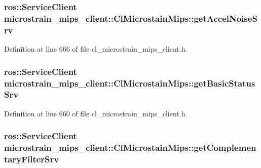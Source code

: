 \subsubsection[{\texorpdfstring{get\+Accel\+Noise\+Srv}{getAccelNoiseSrv}}]{\setlength{\rightskip}{0pt plus 5cm}ros\+::\+Service\+Client microstrain\+\_\+mips\+\_\+client\+::\+Cl\+Microstain\+Mips\+::get\+Accel\+Noise\+Srv\hspace{0.3cm}{\ttfamily [protected]}}\hypertarget{classmicrostrain__mips__client_1_1ClMicrostainMips_a3c8688daacb1472f90d788e186de6643}{}\label{classmicrostrain__mips__client_1_1ClMicrostainMips_a3c8688daacb1472f90d788e186de6643}


Definition at line 666 of file cl\+\_\+microstrain\+\_\+mips\+\_\+client.\+h.

\subsubsection[{\texorpdfstring{get\+Basic\+Status\+Srv}{getBasicStatusSrv}}]{\setlength{\rightskip}{0pt plus 5cm}ros\+::\+Service\+Client microstrain\+\_\+mips\+\_\+client\+::\+Cl\+Microstain\+Mips\+::get\+Basic\+Status\+Srv\hspace{0.3cm}{\ttfamily [protected]}}\hypertarget{classmicrostrain__mips__client_1_1ClMicrostainMips_a9d9417b8082c318709d5644895a4f539}{}\label{classmicrostrain__mips__client_1_1ClMicrostainMips_a9d9417b8082c318709d5644895a4f539}


Definition at line 660 of file cl\+\_\+microstrain\+\_\+mips\+\_\+client.\+h.

\subsubsection[{\texorpdfstring{get\+Complementary\+Filter\+Srv}{getComplementaryFilterSrv}}]{\setlength{\rightskip}{0pt plus 5cm}ros\+::\+Service\+Client microstrain\+\_\+mips\+\_\+client\+::\+Cl\+Microstain\+Mips\+::get\+Complementary\+Filter\+Srv\hspace{0.3cm}{\ttfamily [protected]}}\hypertarget{classmicrostrain__mips__client_1_1ClMicrostainMips_a6011cb4bf116dc0b92eff7b3409c3633}{}\label{classmicrostrain__mips__client_1_1ClMicrostainMips_a6011cb4bf116dc0b92eff7b3409c3633}



